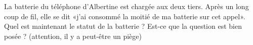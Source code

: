 
\begin{exercice}\label{exosmath-0458}

    La batterie du téléphone d'Albertine est chargée aux deux tiers. Après un long coup de fil, elle se dit «j'ai consommé la moitié de ma batterie sur cet appel». Quel est maintenant le statut de la batterie ? Est-ce que la question est bien posée ? (attention, il y a peut-être un piège)

\end{exercice}
